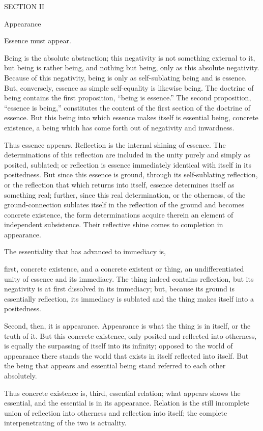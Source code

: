 SECTION II

Appearance

Essence must appear.

Being is the absolute abstraction;
this negativity is not something external to it,
but being is rather being, and nothing but being,
only as this absolute negativity.
Because of this negativity,
being is only as self-sublating being and is essence.
But, conversely, essence as simple self-equality is likewise being.
The doctrine of being contains the first proposition,
“being is essence.”
The second proposition, “essence is being,”
constitutes the content of the first section of the doctrine of essence.
But this being into which essence makes itself is essential being,
concrete existence, a being which has
come forth out of negativity and inwardness.

Thus essence appears.
Reflection is the internal shining of essence.
The determinations of this reflection are included
in the unity purely and simply as posited, sublated;
or reflection is essence immediately identical
with itself in its positedness.
But since this essence is ground,
through its self-sublating reflection,
or the reflection that which returns into itself,
essence determines itself as something real;
further, since this real determination,
or the otherness, of the ground-connection sublates itself
in the reflection of the ground
and becomes concrete existence,
the form determinations acquire therein
an element of independent subsistence.
Their reflective shine comes to completion in appearance.

The essentiality that has advanced to immediacy is,

first, concrete existence,
and a concrete existent or thing,
an undifferentiated unity of essence and its immediacy.
The thing indeed contains reflection, 
but its negativity is at first dissolved in its immediacy;
but, because its ground is essentially reflection,
its immediacy is sublated
and the thing makes itself into a positedness.

Second, then, it is appearance.
Appearance is what the thing is in itself,
or the truth of it.
But this concrete existence,
only posited and reflected into otherness,
is equally the surpassing of itself into its infinity;
opposed to the world of appearance there stands
the world that exists in itself reflected into itself.
But the being that appears and essential being
stand referred to each other absolutely.

Thus concrete existence is, third, essential relation;
what appears shows the essential,
and the essential is in its appearance.
Relation is the still incomplete union of
reflection into otherness and reflection into itself;
the complete interpenetrating of the two is actuality.


